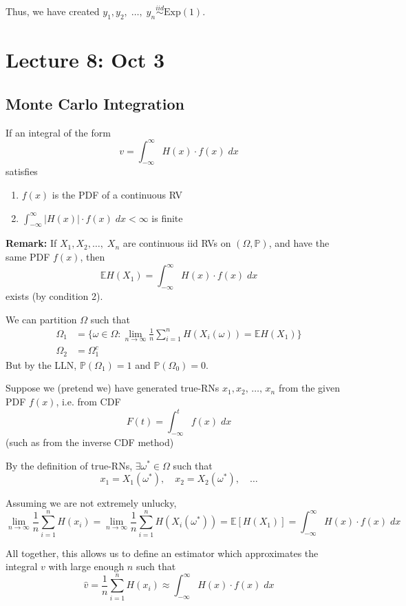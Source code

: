 \documentclass[12pt]{article}
\renewcommand{\hat}[1]{\widehat{#1}}
\renewcommand{\P}{\mathbb{P}}
\newcommand{\E}{\mathbb{E}}
\newcommand{\ellipsis}{\; \dots, \;}
\begin{document}
Thus, we have created $y_1, y_2, \ellipsis y_n \overset{iid}{\sim} \text{Exp}(1)$.

\section*{Lecture 8: Oct 3}
\subsection*{Monte Carlo Integration}
If an integral of the form 
\[v = \int_{-\infty}^{\infty} H(x) \cdot f(x)\; dx\]
satisfies 
\begin{enumerate}
    \item $f(x)$ is the PDF of a continuous RV
    \item $\int_{-\infty}^{\infty} \big\vert H(x) \big\vert \cdot f(x)\; dx < \infty$ is finite
\end{enumerate}

\textbf{Remark:} If $X_1, X_2, \dots,\; X_n$ are continuous iid RVs on $(\Omega, \P)$, and have the same PDF $f(x)$, then 
\[\E H(X_1) = \int_{-\infty}^{\infty} H(x) \cdot f(x)\; dx\]
exists (by condition 2).

We can partition $\Omega$ such that 
\begin{align*}
    \Omega_1 &= \{\omega \in \Omega: \lim_{n\to \infty} \frac{1}{n}\sum_{i=1}^n H(X_i(\omega)) = \E H(X_1)\}\\
    \Omega_2 &= \Omega_1^c
\end{align*}
But by the LLN, $\P(\Omega_1) = 1$ and $\P(\Omega_0) = 0$.

Suppose we (pretend we) have generated true-RNs $x_1, x_2, \, \dots,\, x_n$ from the given PDF $f(x)$, i.e. from CDF 
\[F(t) = \int_{-\infty}^t f(x)\; dx\]
(such as from the inverse CDF method) 

By the definition of true-RNs, $\exists \omega^* \in \Omega$ such that
\[x_1 = X_1(\omega^*), \quad x_2 = X_2(\omega^*), \quad \dots\]

Assuming we are not extremely unlucky, 
\[\lim_{n\to \infty} \frac{1}{n}\sum_{i=1}^n H(x_i) = \lim_{n\to \infty} \frac{1}{n}\sum_{i=1}^n H(X_i(\omega^*)) = \E[H(X_1)] = \int_{-\infty}^{\infty} H(x)\cdot f(x)\; dx\]

All together, this allows us to define an estimator which approximates the integral $v$ with large enough $n$ such that 
\[\boxed{\hat v = \frac{1}{n}\sum_{i=1}^n H(x_i) \approx \int_{-\infty}^{\infty} H(x) \cdot f(x)\; dx}\]
\end{document}

